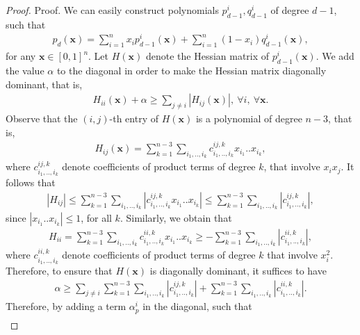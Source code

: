 \documentclass[opre,nonblindrev]{informs3} %
\begin{document}
\begin{appendices}
\begin{proof}{Proof. } 
We can easily construct polynomials $p_{d-1}^i, q_{d-1}^i$ of degree $d-1$, such that 
\begin{align*}
    p_d(\boldsymbol{x}) = \sum_{i=1}^n x_i p_{d-1}^i(\boldsymbol{x}) + \sum_{i=1}^n (1-x_i) q_{d-1}^i(\boldsymbol{x}),
\end{align*} 
for any $\boldsymbol{x} \in [0,1]^n$. Let $H(\boldsymbol{x})$ denote the Hessian matrix of $p_{d-1}^i(\boldsymbol{x})$. We add the value $\alpha$ to the diagonal in order to make the Hessian matrix diagonally dominant, that is,  
\begin{align*}
    H_{ii}(\boldsymbol{x}) + \alpha \ge \sum_{j \neq i} |H_{ij}(\boldsymbol{x})|, \ \forall i, \: \forall \boldsymbol{x}.
\end{align*}
Observe that the $(i,j)$-th entry of $H(\boldsymbol{x})$ is a polynomial of degree $n-3$, that is,
\begin{align*}
    H_{ij}(\boldsymbol{x}) = \sum_{k=1}^{n-3} \sum_{i_1,..,i_k} c_{i_1,..,i_k}^{ij, k} x_{i_1}..x_{i_k},
\end{align*}  
where $c_{i_1,..,i_k}^{ij, k}$ denote coefficients of product terms of degree $k$, that involve $x_i x_j$. It follows that 
\begin{align*}
    |H_{ij}| \le \sum_{k=1}^{n-3} \sum_{i_1,..,i_k} \left \lvert c_{i_1,..,i_k}^{ij, k} x_{i_1}..x_{i_k} \right \rvert \le \sum_{k=1}^{n-3} \sum_{i_1,..,i_k} \left \lvert c_{i_1,..,i_k}^{ij, k} \right \rvert, 
\end{align*}
since $\left \lvert x_{i_1}..x_{i_k} \right \rvert \le 1$, for all $k$. Similarly, we obtain that 
\begin{align*}
    H_{ii} = \sum_{k=1}^{n-3} \sum_{i_1,..,i_k} c_{i_1,..,i_k}^{ii, k} x_{i_1}..x_{i_k} \ge -\sum_{k=1}^{n-3} \sum_{i_1,..,i_k} \left \lvert c_{i_1,..,i_k}^{ii, k} \right \rvert,
\end{align*}  
where $c_{i_1,..,i_k}^{ii, k}$ denote coefficients of product terms of degree $k$ that involve $x_i^2$. Therefore, to ensure that $H(\boldsymbol{x})$ is diagonally dominant, it suffices to have 
\begin{align*}
    \alpha \ge \sum_{j \neq i} \sum_{k=1}^{n-3} \sum_{i_1,..,i_k} \left \lvert c_{i_1,..,i_k}^{ij, k} \right \rvert + \sum_{k=1}^{n-3} \sum_{i_1,..,i_k} \left \lvert c_{i_1,..,i_k}^{ii, k} \right \rvert.
\end{align*}
Therefore, by adding a term $\alpha_p^i$ in the diagonal, such that 
\begin{align*}

\end{align*}
\end{proof}
\end{appendices}
\end{document}
